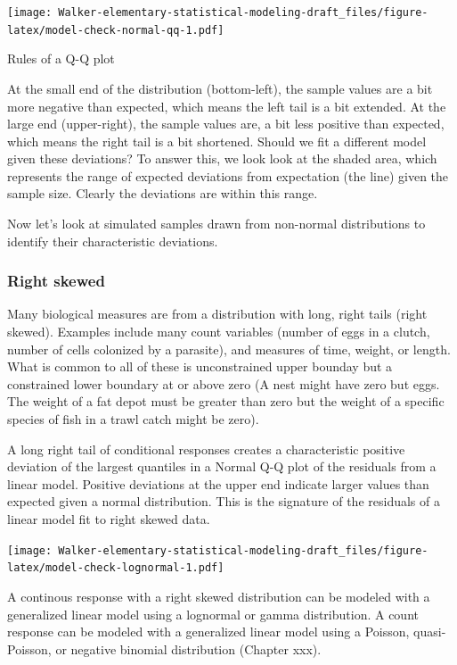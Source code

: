 \documentclass[]{book}
\begin{document}
\texttt{[image: Walker-elementary-statistical-modeling-draft\_files/figure-latex/model-check-normal-qq-1.pdf]}

Rules of a Q-Q plot

At the small end of the distribution (bottom-left), the sample values are a bit more negative than expected, which means the left tail is a bit extended. At the large end (upper-right), the sample values are, a bit less positive than expected, which means the right tail is a bit shortened. Should we fit a different model given these deviations? To answer this, we look look at the shaded area, which represents the range of expected deviations from expectation (the line) given the sample size. Clearly the deviations are within this range.

Now let's look at simulated samples drawn from non-normal distributions to identify their characteristic deviations.

\hypertarget{right-skewed}{%
\subsubsection{Right skewed}\label{right-skewed}}

Many biological measures are from a distribution with long, right tails (right skewed). Examples include many count variables (number of eggs in a clutch, number of cells colonized by a parasite), and measures of time, weight, or length. What is common to all of these is unconstrained upper bounday but a constrained lower boundary at or above zero (A nest might have zero but eggs. The weight of a fat depot must be greater than zero but the weight of a specific species of fish in a trawl catch might be zero).

A long right tail of conditional responses creates a characteristic positive deviation of the largest quantiles in a Normal Q-Q plot of the residuals from a linear model. Positive deviations at the upper end indicate larger values than expected given a normal distribution. This is the signature of the residuals of a linear model fit to right skewed data.

\texttt{[image: Walker-elementary-statistical-modeling-draft\_files/figure-latex/model-check-lognormal-1.pdf]}

A continous response with a right skewed distribution can be modeled with a generalized linear model using a lognormal or gamma distribution. A count response can be modeled with a generalized linear model using a Poisson, quasi-Poisson, or negative binomial distribution (Chapter xxx).
\end{document}
